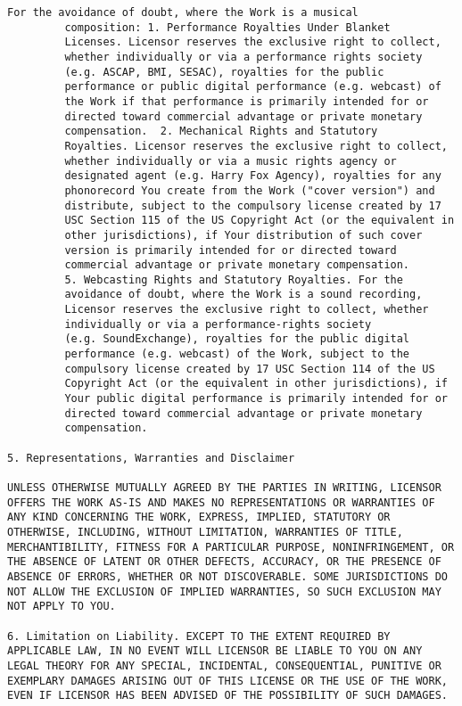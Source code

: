 \begin{lstlisting}[firstnumber=1,]
      For the avoidance of doubt, where the Work is a musical
         composition: 1. Performance Royalties Under Blanket
         Licenses. Licensor reserves the exclusive right to collect,
         whether individually or via a performance rights society
         (e.g. ASCAP, BMI, SESAC), royalties for the public
         performance or public digital performance (e.g. webcast) of
         the Work if that performance is primarily intended for or
         directed toward commercial advantage or private monetary
         compensation.  2. Mechanical Rights and Statutory
         Royalties. Licensor reserves the exclusive right to collect,
         whether individually or via a music rights agency or
         designated agent (e.g. Harry Fox Agency), royalties for any
         phonorecord You create from the Work ("cover version") and
         distribute, subject to the compulsory license created by 17
         USC Section 115 of the US Copyright Act (or the equivalent in
         other jurisdictions), if Your distribution of such cover
         version is primarily intended for or directed toward
         commercial advantage or private monetary compensation.
         5. Webcasting Rights and Statutory Royalties. For the
         avoidance of doubt, where the Work is a sound recording,
         Licensor reserves the exclusive right to collect, whether
         individually or via a performance-rights society
         (e.g. SoundExchange), royalties for the public digital
         performance (e.g. webcast) of the Work, subject to the
         compulsory license created by 17 USC Section 114 of the US
         Copyright Act (or the equivalent in other jurisdictions), if
         Your public digital performance is primarily intended for or
         directed toward commercial advantage or private monetary
         compensation.

5. Representations, Warranties and Disclaimer

UNLESS OTHERWISE MUTUALLY AGREED BY THE PARTIES IN WRITING, LICENSOR
OFFERS THE WORK AS-IS AND MAKES NO REPRESENTATIONS OR WARRANTIES OF
ANY KIND CONCERNING THE WORK, EXPRESS, IMPLIED, STATUTORY OR
OTHERWISE, INCLUDING, WITHOUT LIMITATION, WARRANTIES OF TITLE,
MERCHANTIBILITY, FITNESS FOR A PARTICULAR PURPOSE, NONINFRINGEMENT, OR
THE ABSENCE OF LATENT OR OTHER DEFECTS, ACCURACY, OR THE PRESENCE OF
ABSENCE OF ERRORS, WHETHER OR NOT DISCOVERABLE. SOME JURISDICTIONS DO
NOT ALLOW THE EXCLUSION OF IMPLIED WARRANTIES, SO SUCH EXCLUSION MAY
NOT APPLY TO YOU.

6. Limitation on Liability. EXCEPT TO THE EXTENT REQUIRED BY
APPLICABLE LAW, IN NO EVENT WILL LICENSOR BE LIABLE TO YOU ON ANY
LEGAL THEORY FOR ANY SPECIAL, INCIDENTAL, CONSEQUENTIAL, PUNITIVE OR
EXEMPLARY DAMAGES ARISING OUT OF THIS LICENSE OR THE USE OF THE WORK,
EVEN IF LICENSOR HAS BEEN ADVISED OF THE POSSIBILITY OF SUCH DAMAGES.


\end{lstlisting}
